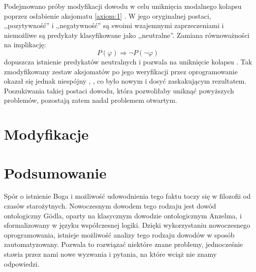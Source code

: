 \documentclass[runningheads]{llncs}
\begin{document}
Podejmowano próby modyfikacji dowodu w celu uniknięcia modalnego kolapsu poprzez osłabienie aksjomatu \ref{axiom:1} \cite{anderson1990}. W jego oryginalnej postaci, ,,pozytywność'' i ,,negatywność'' są swoimi wzajemnymi zaprzeczeniami i niemożliwe są predykaty klasyfikowane jako ,,neutralne''. Zamiana równoważności na implikację:
\begin{equation*}
P(\varphi) \Rightarrow \neg P( \neg \varphi )
\end{equation*}
dopuszcza istnienie predykatów neutralnych i pozwala na uniknięcie kolapsu \cite{anderson1996}. Tak zmodyfikowany zestaw aksjomatów po jego weryfikacji przez oprogramowanie okazał się jednak niespójny \cite{benzmuller2014}, \cite{benzmuller2016}, co było nowym i dosyć zaskakującym rezultatem. Poszukiwania takiej postaci dowodu, która pozwoliłaby uniknąć powyższych problemów, pozostają zatem nadal problemem otwartym. 

\section{Modyfikacje} \label{sec:modyfikacje}


\section{Podsumowanie} \label{sec:summary}
Spór o istnienie Boga i możliwość udowodnienia tego faktu toczy się w filozofii od czasów starożytnych. Nowoczesnym dowodem tego rodzaju jest dowód ontologiczny G\"odla, oparty na klasycznym dowodzie ontologicznym Anzelma, i sformalizowany w języku współczesnej logiki. Dzięki wykorzystaniu nowoczesnego oprogramowania, istnieje możliwość analizy tego rodzaju dowodów w sposób zautomatyzowany. Pozwala to rozwiązać niektóre znane problemy, jednocześnie stawia przez nami nowe wyzwania i pytania, na które wciąż nie znamy odpowiedzi. 




\end{document}

